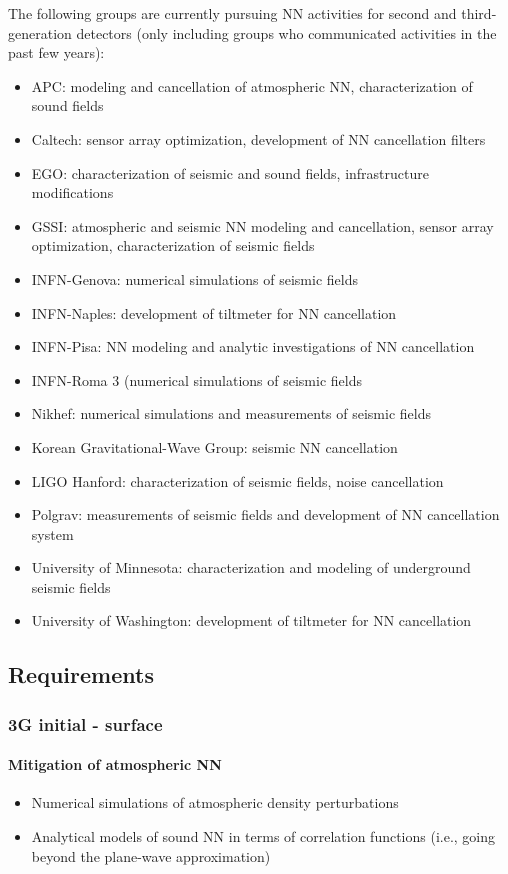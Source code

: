 The following groups are currently pursuing NN activities for second and third-generation detectors (only including groups who communicated activities in the past few years):
\begin{itemize}
\item APC: modeling and cancellation of atmospheric NN, characterization of sound fields
\item Caltech: sensor array optimization, development of NN cancellation filters
\item EGO: characterization of seismic and sound fields, infrastructure modifications
\item GSSI: atmospheric and seismic NN modeling and cancellation, sensor array optimization, characterization of seismic fields
\item INFN-Genova: numerical simulations of seismic fields
\item INFN-Naples: development of tiltmeter for NN cancellation 
\item INFN-Pisa: NN modeling and analytic investigations of NN cancellation
\item INFN-Roma 3 (numerical simulations of seismic fields
\item Nikhef: numerical simulations and measurements of seismic fields
\item Korean Gravitational-Wave Group: seismic NN cancellation
\item LIGO Hanford: characterization of seismic fields, noise cancellation
\item Polgrav: measurements of seismic fields and development of NN cancellation system
\item University of Minnesota: characterization and modeling of underground seismic fields
\item University of Washington: development of tiltmeter for NN cancellation
\end{itemize}


\subsection{Requirements}
\subsubsection{3G initial - surface}
\paragraph{Mitigation of atmospheric NN}
\begin{itemize}
\item Numerical simulations of atmospheric density perturbations
\item Analytical models of sound NN in terms of correlation functions (i.e., going beyond the plane-wave approximation)
\end{itemize}

